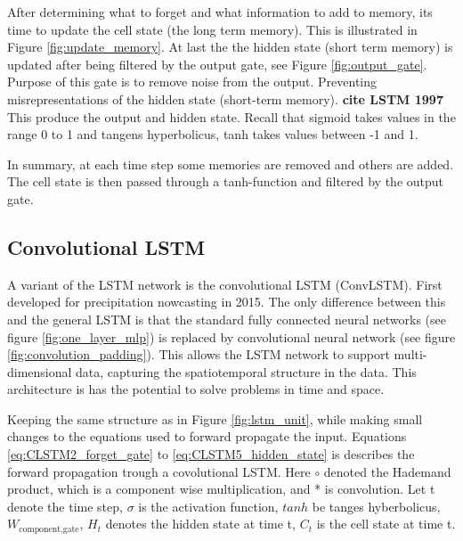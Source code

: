 \documentclass{article}
\begin{document}
After determining what to forget and what information to add to memory, its time to update the cell state (the long term memory). This is illustrated in Figure \ref{fig:update_memory}. At last the the hidden state (short term memory) is updated after being filtered by the output gate, see Figure \ref{fig:output_gate}. Purpose of this gate is to remove noise from the output. Preventing misrepresentations of the hidden state (short-term memory). \textbf{cite LSTM 1997} This produce the output and hidden state. Recall that sigmoid takes values in the range 0 to 1 and tangens hyperbolicus, tanh takes values between -1 and 1.

In summary, at each time step some memories are removed and others are added. The cell state is then passed through a tanh-function and filtered by the output gate. 

\subsection{Convolutional LSTM}  \label{sec:convolutional_lstm}
A variant of the LSTM network is the convolutional LSTM (ConvLSTM). First developed for precipitation nowcasting in 2015. The only difference between this and the general LSTM is that the standard fully connected neural networks (see figure \ref{fig:one_layer_mlp}) is replaced by convolutional neural network (see figure \ref{fig:convolution_padding}). This allows the LSTM network to support multi-dimensional data, capturing the spatiotemporal structure in the data. This architecture is has the potential to solve problems in time and space. 



Keeping the same structure as in Figure \ref{fig:lstm_unit}, while making small changes to the equations used to forward propagate the input. Equations \eqref{eq:CLSTM2_forget_gate} to \eqref{eq:CLSTM5_hidden_state} is describes the forward propagation trough a covolutional LSTM. Here $\circ$ denoted the Hademand product, which is a component wise multiplication, and * is convolution. 
Let t denote the time step, $\sigma$ is the activation function, $tanh$ be tanges hyberbolicus, $W_{\text{component}, \text{gate}}$, $H_{t}$ denotes the hidden state at time t, $C_{t}$ is the cell state at time t. 
\end{document}
